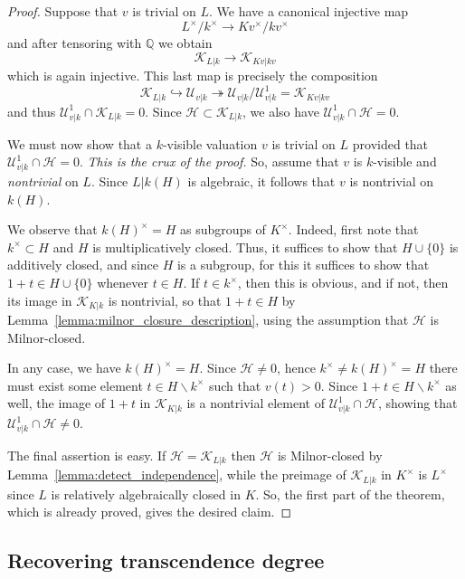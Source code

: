 \documentclass[12pt]{amsart}
\newcommand{\Qbb}{\mathbb{Q}}
\newcommand{\smin}{\smallsetminus}
\newcommand{\Hcal}{\mathcal{H}}
\newcommand{\Ucal}{\mathcal{U}}
\newcommand{\Kcal}{\mathcal{K}}
\theoremstyle{definition}
\begin{document}
\begin{proof}
  Suppose that $v$ is trivial on $L$.
  We have a canonical injective map
  \[ L^{\times}/k^{\times} \to Kv^{\times}/kv^{\times} \]
  and after tensoring with $\Qbb$ we obtain
  \[ \Kcal_{L|k} \to \Kcal_{Kv|kv} \]
  which is again injective.
  This last map is precisely the composition
  \[ \Kcal_{L|k} \hookrightarrow \Ucal_{v|k} \twoheadrightarrow \Ucal_{v|k}/\Ucal_{v|k}^{1} = \Kcal_{Kv|kv} \]
  and thus $\Ucal_{v|k}^{1} \cap \Kcal_{L|k} = 0$.
  Since $\Hcal \subset \Kcal_{L|k}$, we also have $\Ucal_{v|k}^{1} \cap \Hcal = 0$.

  We must now show that a $k$-visible valuation $v$ is trivial on $L$ provided that $\Ucal_{v|k}^{1} \cap \Hcal = 0$.
  \emph{This is the crux of the proof.}
  So, assume that $v$ is $k$-visible and \emph{nontrivial} on $L$.
  Since $L|k(H)$ is algebraic, it follows that $v$ is nontrivial on $k(H)$.

  We observe that $k(H)^{\times} = H$ as subgroups of $K^{\times}$.
  Indeed, first note that $k^{\times} \subset H$ and $H$ is multiplicatively closed.
  Thus, it suffices to show that $H \cup \{0\}$ is additively closed, and since $H$ is a subgroup, for this it suffices to show that $1 + t \in H \cup \{0\}$ whenever $t \in H$.
  If $t \in k^{\times}$, then this is obvious, and if not, then its image in $\Kcal_{K|k}$ is nontrivial, so that $1 + t \in H$ by Lemma~\ref{lemma:milnor_closure_description}, using the assumption that $\Hcal$ is Milnor-closed.

  In any case, we have $k(H)^{\times} = H$.
  Since $\Hcal \neq 0$, hence $k^{\times} \neq k(H)^{\times} = H$ there must exist some element $t \in H \smin k^{\times}$ such that $v(t) > 0$.
  Since $1 + t \in H \smin k^{\times}$ as well, the image of $1 + t$ in $\Kcal_{K|k}$ is a nontrivial element of $\Ucal_{v|k}^{1} \cap \Hcal$, showing that $\Ucal_{v|k}^{1} \cap \Hcal \neq 0$.

  The final assertion is easy.
  If $\Hcal = \Kcal_{L|k}$ then $\Hcal$ is Milnor-closed by Lemma~\ref{lemma:detect_independence}, while the preimage of $\Kcal_{L|k}$ in $K^{\times}$ is $L^{\times}$ since $L$ is relatively algebraically closed in $K$.
  So, the first part of the theorem, which is already proved, gives the desired claim.
\end{proof}

\subsection{Recovering transcendence degree}
\end{document}
